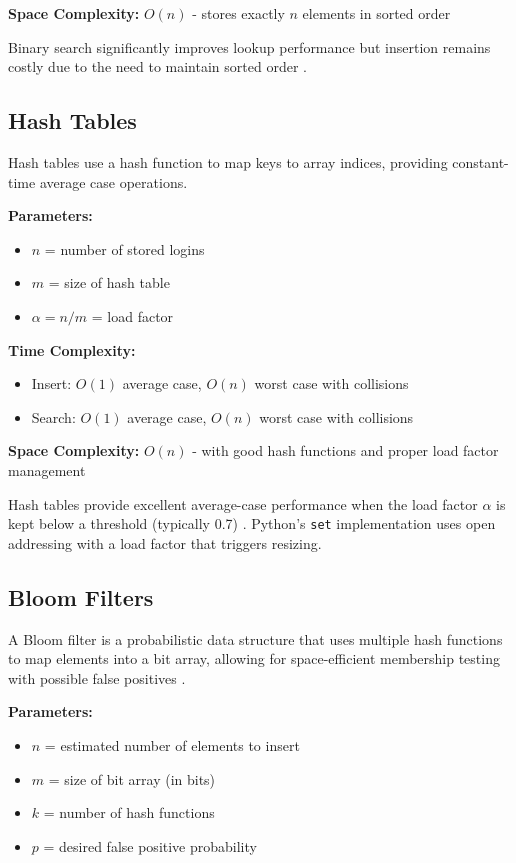 \textbf{Space Complexity:} $O(n)$ - stores exactly $n$ elements in sorted order

Binary search significantly improves lookup performance but insertion remains costly due to the need to maintain sorted order \cite{cormen2009introduction}.

\subsection{Hash Tables}

Hash tables use a hash function to map keys to array indices, providing constant-time average case operations.

\textbf{Parameters:}
\begin{itemize}
    \item $n$ = number of stored logins
    \item $m$ = size of hash table
    \item $\alpha = n/m$ = load factor
\end{itemize}

\textbf{Time Complexity:}
\begin{itemize}
    \item Insert: $O(1)$ average case, $O(n)$ worst case with collisions
    \item Search: $O(1)$ average case, $O(n)$ worst case with collisions
\end{itemize}

\textbf{Space Complexity:} $O(n)$ - with good hash functions and proper load factor management

Hash tables provide excellent average-case performance when the load factor $\alpha$ is kept below a threshold (typically 0.7) \cite{cormen2009introduction}. Python's \texttt{set} implementation uses open addressing with a load factor that triggers resizing.

\subsection{Bloom Filters}

A Bloom filter is a probabilistic data structure that uses multiple hash functions to map elements into a bit array, allowing for space-efficient membership testing with possible false positives \cite{bloom1970space}.

\textbf{Parameters:}
\begin{itemize}
    \item $n$ = estimated number of elements to insert
    \item $m$ = size of bit array (in bits)
    \item $k$ = number of hash functions
    \item $p$ = desired false positive probability
\end{itemize}


